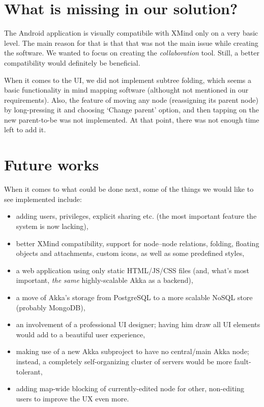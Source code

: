 \section{What is missing in our solution?}
\label{summary-missing}
The Android application is visually compatibile with XMind only on a very basic level. The main reason for that is that that was not the main issue while creating the software. We wanted to focus on creating the \emph{collaboration} tool. Still, a better compatibility would definitely be beneficial. 

When it comes to the UI, we did not implement subtree folding, which seems a basic functionality in mind mapping software (althought not mentioned in our requirements). Also, the feature of moving any node (reassigning its parent node) by long-pressing it and choosing `Change parent' option, and then tapping on the new parent-to-be was not implemented. At that point, there was not enough time left to add it.

\section{Future works}
\label{summary-future}
When it comes to what could be done next, some of the things we would like to see implemented include:

\begin{itemize}
	\item adding users, privileges, explicit sharing etc. (the most important feature the system is now lacking),
	\item better XMind compatibility, support for node--node relations, folding, floating objects and attachments, custom icons, as well as some predefined styles,
	\item a web application using only static HTML/JS/CSS files (and, what's most important, \emph{the same} highly-scalable Akka as a backend),
	\item a move of Akka's storage from PostgreSQL to a more scalable NoSQL store (probably MongoDB),
	\item an involvement of a professional UI designer; having him draw all UI elements would add to a beautiful user experience,
	\item making use of a new  Akka subproject to have no central/main Akka node; instead, a completely self-organizing cluster of servers would be more fault-tolerant,
	\item adding map-wide blocking of currently-edited node for other, non-editing users to improve the UX even more.
\end{itemize}
